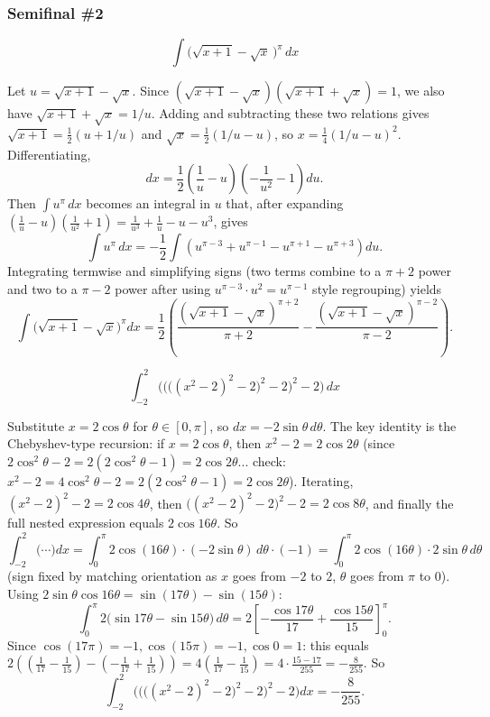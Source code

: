 \subsubsection*{Semifinal \#2}
\begin{questions}

\question \[\int\big(\sqrt{x+1}-\sqrt x\,\big)^\pi\,dx\]
\begin{solution}
Let $u=\sqrt{x+1}-\sqrt x$. Since $(\sqrt{x+1}-\sqrt x)(\sqrt{x+1}+\sqrt x)=1$, we also have $\sqrt{x+1}+\sqrt x=1/u$. Adding and subtracting these two relations gives $\sqrt{x+1}=\tfrac12(u+1/u)$ and $\sqrt x=\tfrac12(1/u-u)$, so $x=\tfrac14(1/u-u)^2$. Differentiating,
\[dx=\frac12\left(\frac1u-u\right)\left(-\frac1{u^2}-1\right)du.\]
Then $\int u^\pi\,dx$ becomes an integral in $u$ that, after expanding $\left(\tfrac1u-u\right)\left(\tfrac1{u^2}+1\right)=\tfrac1{u^3}+\tfrac1u-u-u^3$, gives
\[\int u^\pi\,dx=-\frac12\int\left(u^{\pi-3}+u^{\pi-1}-u^{\pi+1}-u^{\pi+3}\right)du.\]
Integrating termwise and simplifying signs (two terms combine to a $\pi+2$ power and two to a $\pi-2$ power after using $u^{\pi-3}\cdot u^{2}=u^{\pi-1}$ style regrouping) yields
\[\int\big(\sqrt{x+1}-\sqrt x\big)^\pi dx=\frac12\left(\frac{(\sqrt{x+1}-\sqrt x)^{\pi+2}}{\pi+2}-\frac{(\sqrt{x+1}-\sqrt x)^{\pi-2}}{\pi-2}\right).\]
\end{solution}

\question \[\int_{-2}^{2}\Big(\big(\big((x^2-2)^2-2\big)^2-2\big)^2-2\Big)\,dx\]
\begin{solution}
Substitute $x=2\cos\theta$ for $\theta\in[0,\pi]$, so $dx=-2\sin\theta\,d\theta$. The key identity is the Chebyshev-type recursion: if $x=2\cos\theta$, then $x^2-2=2\cos2\theta$ (since $2\cos^2\theta-2=2(2\cos^2\theta-1)=2\cos2\theta$... check: $x^2-2=4\cos^2\theta-2=2(2\cos^2\theta-1)=2\cos2\theta$). Iterating, $(x^2-2)^2-2=2\cos4\theta$, then $\big((x^2-2)^2-2\big)^2-2=2\cos8\theta$, and finally the full nested expression equals $2\cos16\theta$. So
\[\int_{-2}^2\Big(\cdots\Big)dx=\int_0^\pi 2\cos(16\theta)\cdot(-2\sin\theta)\,d\theta\cdot(-1)=\int_0^\pi 2\cos(16\theta)\cdot2\sin\theta\,d\theta\]
(sign fixed by matching orientation as $x$ goes from $-2$ to $2$, $\theta$ goes from $\pi$ to $0$). Using $2\sin\theta\cos16\theta=\sin(17\theta)-\sin(15\theta)$:
\[\int_0^\pi 2\big(\sin17\theta-\sin15\theta\big)\,d\theta=2\left[-\frac{\cos17\theta}{17}+\frac{\cos15\theta}{15}\right]_0^\pi.\]
Since $\cos(17\pi)=-1,\cos(15\pi)=-1,\cos0=1$: this equals $2\left(\left(\frac1{17}-\frac1{15}\right)-\left(-\frac1{17}+\frac1{15}\right)\right)=4\left(\frac1{17}-\frac1{15}\right)=4\cdot\frac{15-17}{255}=-\frac{8}{255}$. So
\[\int_{-2}^2\Big(\big(\big((x^2-2)^2-2\big)^2-2\big)^2-2\Big)dx=-\frac{8}{255}.\]
\end{solution}


\end{questions}
